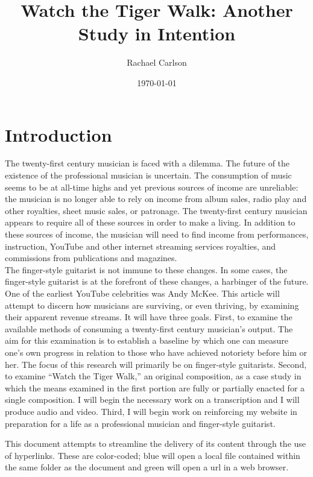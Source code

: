 \documentclass[unicode,hyperfootnotes=false,xetex,colorlinks=true,nofonts,nobib]{tufte-handout}
\title{Watch the Tiger Walk: Another Study in Intention}
\author{Rachael Carlson}
\date{\today}
\begin{document}
\maketitle{}
\section{Introduction}
The twenty-first century musician is faced with a dilemma. The future of the existence of the professional musician is uncertain. The consumption of music seems to be at all-time highs and yet previous sources of income are unreliable: the musician is no longer able to rely on income from album sales, radio play and other royalties, sheet music sales, or patronage. The twenty-first century musician appears to require all of these sources in order to make a living. In addition to these sources of income, the musician will need to find income from performances, instruction, YouTube and other internet streaming services royalties, and commissions from publications and magazines. \\

The finger-style guitarist is not immune to these changes. In some cases, the finger-style guitarist is at the forefront of these changes, a harbinger of the future. One of the earliest YouTube celebrities was Andy McKee. This article will attempt to discern how musicians are surviving, or even thriving, by examining their apparent revenue streams. It will have three goals. First, to examine the available methods of consuming a twenty-first century musician's output. The aim for this examination is to establish a baseline by which one can measure one's own progress in relation to those who have achieved notoriety before him or her. The focus of this research will primarily be on finger-style guitarists.  Second, to examine ``Watch the Tiger Walk,'' an original composition, as a case study in which the means examined in the first portion are fully or partially enacted for a single composition. I will begin the necessary work on a transcription and I will produce audio and video.  Third, I will begin work on reinforcing my website in preparation for a life as a professional musician and finger-style guitarist.

This document attempts to streamline the delivery of its content through the use of hyperlinks. These are color-coded; blue will open a local file contained within the same folder as the document and green will open a url in a web browser.
\end{document}
